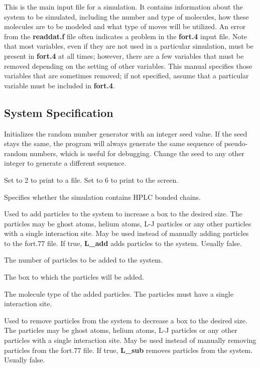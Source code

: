 \documentclass[12pt,letterpaper]{article}
\begin{document}
\noindent This is the main input file for a simulation.  It contains information about the system to be simulated,
including the number and type of molecules, how these molecules are to be modeled and what type of
moves will be utilized.  An error from the {\textbf{readdat.f}} file often indicates a problem in the {\textbf{fort.4}} input file.
Note that most variables, even if they are not used in a particular simulation, must be present in {\bf fort.4} at all times;
however, there are a few variables that must be removed depending on the setting of other variables.  
This manual specifies those variables that are sometimes removed; if not specified, assume that a particular variable 
must be included in {\bf fort.4}.

\subsection{System Specification}

 Initializes the random number generator with an
integer seed value. If the seed stays the same, the program will
always generate the same sequence of pseudo-random numbers, which is useful for
debugging.  Change the seed to any other integer to generate a different sequence.  

 Set to 2 to print to a file.  Set to 6 to print to the screen.

 Specifies whether the simulation contains HPLC bonded chains.

 Used to add particles to the system to increase a box to the desired size.
The particles may be ghost atoms, helium atoms, L-J particles or any other particles with a single interaction site.
May be used instead of manually adding particles to the fort.77 file.  If true, {\textbf{L\_add}} adds particles
to the system.  Usually false.

 The number of particles to be added to the system. 

 The box to which the particles will be added.

 The molecule type of the added particles.  The particles must have a 
single interaction site.

 Used to remove particles from the system to decrease a box to the desired size.
The particles may be ghost atoms, helium atoms, L-J particles or any other particles with a single interaction site.
May be used instead of manually removing particles from the fort.77 file.  If true, {\textbf{L\_sub}} removes particles
from the system.  Usually false.
\end{document}
